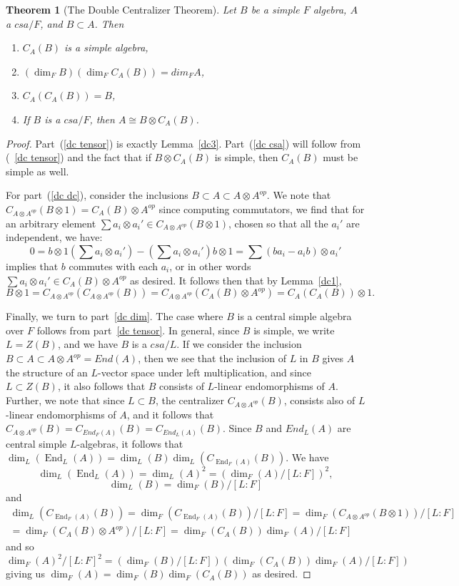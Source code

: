 \documentclass[12pt]{report}
\theoremstyle{plain}
\newtheorem{thm}{Theorem}[section]
\newcommand{\oper}[1]{\operatorname{#1}}
\newcommand{\End}{\oper{End}}
\begin{document}
\begin{thm}[The Double Centralizer Theorem]
Let $B$ be a simple $F$ algebra, $A$ a $csa/F$, and $B \subset A$. Then
\begin{enumerate}[1. ]
\item \label{dc csa} $C_A(B)$ is a simple algebra,
\item \label{dc dim} $(\dim_F B)(\dim_F C_A(B)) = dim_F A$,
\item \label{dc dc} $C_A(C_A(B)) = B$,
\item \label{dc tensor} If $B$ is a $csa/F$, then $A \cong B \otimes
C_A(B)$.
\end{enumerate}
\end{thm}
\begin{proof}
Part~(\ref{dc tensor}) is exactly Lemma~\ref{dc3}.  Part~(\ref{dc csa})
will follow from (~\ref{dc tensor}) and the fact that if $B \otimes C_A(B)$
is simple, then $C_A(B)$ must be simple as well. 

For part~(\ref{dc dc}), consider the inclusions $B \subset A \subset A
\otimes A^{op}$. We note that $C_{A \otimes A^{op}}(B \otimes 1) = C_A(B)
\otimes A^{op}$ since computing commutators, we find that for an arbitrary
element $\sum a_i \otimes a_i' \in C_{A \otimes A^{op}}(B \otimes 1)$,
chosen so that all the $a_i'$ are independent, we have:
\[0 = b \otimes 1 \left(\sum a_i \otimes a_i'\right) - \left(\sum a_i \otimes
a_i'\right) b \otimes 1 = \sum (b a_i - a_i b) \otimes a_i' \]
implies that $b$ commutes with each $a_i$, or in other words $\sum a_i
\otimes a_i' \in C_A(B) \otimes A^{op}$ as desired. It follows then that by
Lemma~\ref{dc1}, 
\[B \otimes 1 = C_{A \otimes A^{op}}(C_{A \otimes A^{op}}(B)) = C_{A \otimes
A^{op}}(C_A(B) \otimes A^{op}) = C_A(C_A(B)) \otimes 1.\]

Finally, we turn to part~\ref{dc dim}. The case where $B$ is a central
simple algebra over $F$ follows from part~\ref{dc tensor}. In general,
since $B$ is simple, we write $L = Z(B)$, and we have $B$ is a $csa/L$. If
we consider the inclusion $B \subset A \subset A \otimes A^{op} = End(A)$,
then we see that the inclusion of $L$ in $B$ gives $A$ the structure of an
$L$-vector space under left multiplication, and since $L \subset Z(B)$, it
also follows that $B$ consists of $L$-linear endomorphisms of $A$. Further,
we note that since $L \subset B$, the centralizer $C_{A \otimes
A^{op}}(B)$, consists also of $L$-linear endomorphisms of $A$, and it
follows that $C_{A \otimes A^{op}}(B) = C_{End_F(A)}(B) = C_{End_L(A)}(B)$.
Since $B$ and $End_L(A)$ are central simple $L$-algebras, it follows that
$\dim_L(\End_L(A)) = \dim_L(B)\dim_L(C_{\End_F(A)}(B))$.
We have 
\[\dim_L(\End_L(A)) = \dim_L(A)^2 = (\dim_F(A)/[L:F])^2,\]
\[\dim_L(B) = \dim_F(B)/[L:F]\]
and
\begin{multline*}
\dim_L(C_{\End_F(A)}(B)) = \dim_F(C_{\End_F(A)}(B))/[L:F] = \dim_F(C_{A
\otimes A^{op}}(B \otimes 1))/[L:F] \\
=
\dim_F(C_A(B) \otimes A^{op})/[L:F] = \dim_F(C_A(B)) \dim_F(A)/[L:F]
\end{multline*}
and so
\[ \dim_F(A)^2/[L:F]^2 = \left(\dim_F(B)/[L:F]\right)\left( \dim_F(C_A(B)) \dim_F(A)/[L:F]
\right)\]
giving us $\dim_F(A) = \dim_F(B) \dim_F(C_A(B))$ as desired.


\end{proof}
\end{document}
